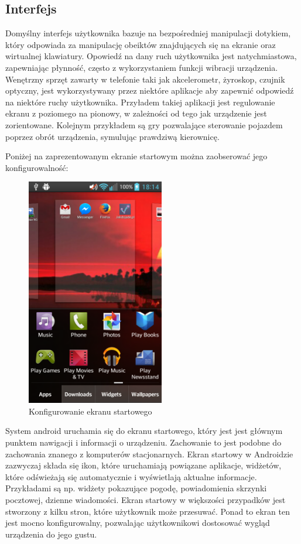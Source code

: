 \subsection{Interfejs}

Domyślny interfejs użytkownika bazuje na bezpośredniej manipulacji\cite{android:24} dotykiem, który odpowiada za manipulację obeiktów znajdujących się na ekranie oraz wirtualnej klawiatury. \cite{android:24} Opowiedź na dany ruch użytkownika jest natychmiastowa, zapewniając płynność, często z wykorzystaniem funkcji wibracji urządzenia. Wenętrzny sprzęt zawarty w telefonie taki jak akcelerometr, żyroskop, czujnik optyczny, jest wykorzystywany przez niektóre aplikacje aby zapewnić odpowiedź na niektóre ruchy użytkownika.\cite{android:25} Przyładem takiej aplikacji jest regulowanie ekranu z poziomego na pionowy, w zależności od tego jak urządzenie jest zorientowane. Kolejnym przykładem są gry pozwalające sterowanie pojazdem poprzez obrót urządzenia, symulując prawdziwą kierownicę.\cite{android:26}

Poniżej na zaprezentowanym ekranie startowym można zaobserować jego konfigurowalność:

\begin{figure}[H] 
\centering\includegraphics[width=6cm]{figures/android/homescreen}
\caption{Konfigurowanie ekranu startowego}
\end{figure}

System android uruchamia się do ekranu startowego, który jest jest głównym punktem nawigacji i informacji o urządzeniu. Zachowanie to jest podobne do zachowania znanego z komputerów stacjonarnych. Ekran startowy w Androidzie zazwyczaj składa się ikon, które uruchamiają powiązane aplikacje, widżetów, które odświeżają się automatycznie i wyświetlają aktualne informacje. Przykładami są np. widżety pokazujące pogodę, powiadomienia skrzynki pocztowej, dzienne wiadomości.\cite{android:27} Ekran startowy w większości przypadków jest stworzony z kilku stron, które użytkownik może przesuwać. Ponad to ekran ten jest mocno konfigurowalny, pozwalając użytkownikowi dostosować wygląd urządzenia do jego gustu.\cite{android:28} 




